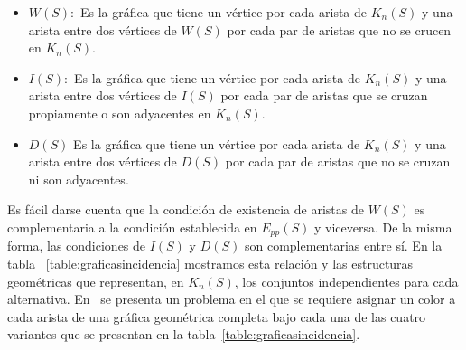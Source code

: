 \begin{itemize}
  \item $W(S):$ Es la gráfica que tiene un vértice por cada arista de $K_n(S)$ y
  una arista entre dos vértices de $W(S)$ por cada par de aristas que no se
  crucen en $K_n(S)$. %
  \item $I(S):$ Es la gráfica que tiene un vértice por cada arista de $K_n(S)$ y
  una arista entre dos vértices de $I(S)$ por cada par de aristas que
  se cruzan propiamente o son adyacentes en $K_n(S)$. %
  \item $D(S)$ Es la gráfica que tiene un vértice por cada arista de $K_n(S)$ y
  una arista entre dos vértices de $D(S)$ por cada par de aristas que
  no se cruzan ni son adyacentes. %
\end{itemize}

Es fácil darse cuenta que la condición de existencia de aristas de $W(S)$ es
complementaria a la condición establecida en $E_{pp}(S)$ y viceversa. De la misma
forma, las condiciones de $I(S)$ y $D(S)$ son complementarias entre sí. En la tabla
~\ref{table:graficasincidencia} mostramos esta relación y las estructuras geométricas
que representan, en $K_n(S)$, los conjuntos independientes para cada alternativa.
En~\cite{OpenGarden2009} se presenta un problema en el que se requiere asignar un
color a cada arista de una gráfica geométrica completa bajo cada una de las cuatro
variantes que se presentan en la tabla~\ref{table:graficasincidencia}.

